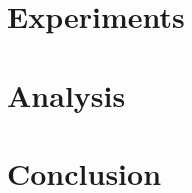 \documentclass{article}
\begin{document}
\section{Experiments}


\section{Analysis}


\section{Conclusion}



% 
\end{document}
